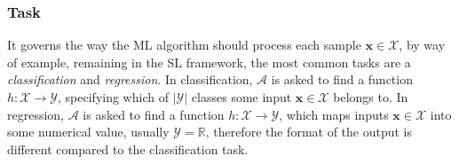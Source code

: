 \subsubsection{Task}
It governs the way the ML algorithm should process each sample $\bm{x} \in \mathcal{X}$, by way of example, remaining in the SL framework, the most common tasks are a \textit{classification} and \textit{regression}.
In classification, $\mathscr{A}$ is asked to find a function $h: \mathcal{X} \to \mathcal{Y}$, specifying which of $|\mathcal{Y}|$ classes%
some input $\bm{x} \in \mathcal{X}$ belongs to. %
In regression, $\mathscr{A}$ is asked to find a function $h: \mathcal{X} \to \mathcal{Y}$, which maps inputs $\bm{x} \in \mathcal{X}$ into some numerical value, usually $\mathcal{Y} = \mathbb{R}$, therefore the format of the output is different compared to the classification task.
